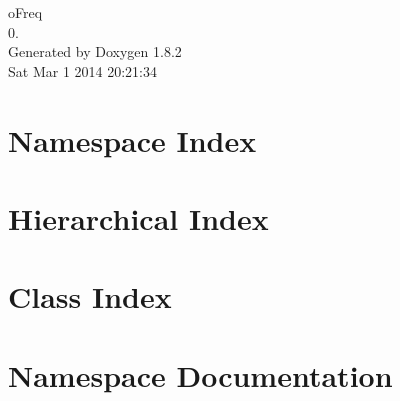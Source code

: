 \documentclass{book}
\begin{document}
\hypersetup{pageanchor=false,citecolor=blue}
\begin{titlepage}
\vspace*{7cm}
\begin{center}
{\Large o\-Freq \\[1ex]\large 0. }\\
\vspace*{1cm}
{\large Generated by Doxygen 1.8.2}\\
\vspace*{0.5cm}
{\small Sat Mar 1 2014 20:21:34}\\
\end{center}
\end{titlepage}
\clearemptydoublepage
{}
\tableofcontents
\clearemptydoublepage
{}
\hypersetup{pageanchor=true,citecolor=blue}
\chapter{Namespace Index}

\chapter{Hierarchical Index}

\chapter{Class Index}

\chapter{Namespace Documentation}


\end{document}
